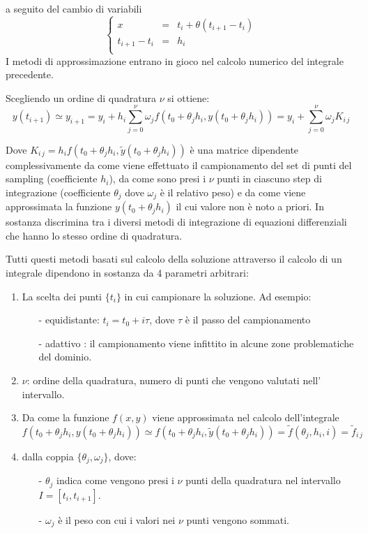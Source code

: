 \documentclass[11pt]{article}
\begin{document}
a seguito del cambio di variabili
	\begin{displaymath}
	\left\{ 
			 \begin{array}{rcl}
				x & = & t_{i} + \theta(t_{i+1}-t_{i})     \\
				t_{i+1}-t_{i} & = & h_{i}    \\
			\end{array}\right.
	\end{displaymath}
I metodi di approssimazione entrano in gioco nel calcolo numerico del integrale precedente.

Scegliendo un ordine di quadratura $\nu$ si ottiene:
	\begin{equation}
		y(t_{i+1}) \simeq y_{i+1} = 
		y_{i} + h_{i}\sum_{j=0}^{\nu}\omega_{j} f(t_{0}+\theta_{j} h_{i} , y(t_{0}+\theta_{j} h_{i})) 
		= y_{i} + \sum_{j=0}^{\nu} \omega_{j} K_{i\,j}
	\end{equation}

Dove $K_{i\,j} = h_{i}f(t_{0}+\theta_{j} h_{i} , \tilde{y}(t_{0}+\theta_{j} h_{i}))$ è una matrice dipendente complessivamente da come viene effettuato il campionamento del set di punti del sampling (coefficiente $h_{i}$), da come sono presi i $\nu$ punti in ciascuno step di integrazione (coefficiente $\theta_{j}$ dove $\omega_{j}$ è il relativo peso) e da come viene approssimata la funzione $y(t_{0}+\theta_{j} h_{i})$ il cui valore non è noto a priori.
In sostanza discrimina tra i diversi metodi di integrazione di equazioni differenziali che hanno lo stesso ordine di quadratura.

Tutti questi metodi basati sul calcolo della soluzione attraverso il calcolo di un integrale dipendono in sostanza da 4 parametri arbitrari:
\begin{enumerate}
\item La scelta dei punti $\{ t_{i}\}$ in cui campionare la soluzione. Ad esempio:
	\begin{itemize}
	\item[-] equidistante: $ t_{i} = t_{0} + i \tau$, dove $\tau$ è il passo del campionamento
	\item[-] adattivo :  il campionamento viene infittito in alcune zone problematiche del dominio.
	\end{itemize}
\item $\nu$: ordine della quadratura, numero di punti che vengono valutati nell' intervallo.
\item Da come la funzione $f(x,y)$ viene approssimata nel calcolo dell'integrale
		$$f(t_{0}+\theta_{j} h_{i} , y(t_{0}+\theta_{j} h_{i})) \simeq f(t_{0}+\theta_{j} h_{i} , \tilde{y}(t_{0}+\theta_{j} h_{i}))=\tilde{f}(\theta_{j}, h_{i},i)=\tilde{f}_{i \, j}  $$
\item dalla coppia $\{ \theta_{j}, \omega_{j} \}$, dove:
	\begin{itemize}
	\item[-] $\theta_{j}$ indica come vengono presi i $\nu$ punti della quadratura nel intervallo $I=[t_{i},t_{i+1}]$.
	\item[-] $\omega_{j}$ è il peso con cui i valori nei $\nu$ punti vengono sommati.
	\end{itemize}
\end{enumerate}
\end{document}
